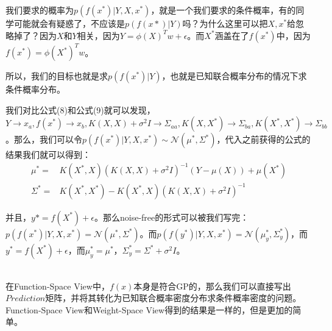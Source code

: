 \documentclass[a4paper]{article}
\begin{document}
我们要求的概率为$p(f(x^\ast)|Y,X,x^\ast)$，就是一个我们要求的条件概率，有的同学可能就会有疑惑了，不应该是$p(f(x\ast)|Y)$吗？为什么这里可以把$X,x^\ast$给忽略掉了？因为$X$和$Y$相关，因为$Y=\phi(X)^Tw+\epsilon$。而$X^\ast$涵盖在了$f(x^\ast)$中，因为$f(x^\ast) = \phi(X^\ast)^Tw$。


所以，我们的目标也就是求$p(f(x^\ast)|Y)$，也就是{\color{red}已知联合概率分布的情况下求条件概率分布。}

我们对比公式(8)和公式(9)就可以发现，$Y\rightarrow x_a,f(x^\ast)\rightarrow x_b,K(X,X)+\sigma^2I \rightarrow \Sigma_{aa},K(X,X^\ast) \rightarrow \Sigma_{ba},K(X^\ast,X^\ast)\rightarrow \Sigma_{bb}$。那么，我们可以令$p(f(x^\ast)|Y,X,x^\ast)\sim\mathcal{N}(\mu^\ast,\Sigma^\ast)$，代入之前获得的公式的结果我们就可以得到：
\begin{equation}
    \begin{split}
        \mu^\ast = & K(X^\ast,X)(K(X,X)+\sigma^2I)^{-1}(Y-\mu(X))+\mu(X^\ast) \\
        \Sigma^\ast = & 
        K(X^\ast,X^\ast)-K(X^\ast,X)(K(X,X)+\sigma^2I)^{-1}
    \end{split}
\end{equation}

并且，$y\ast = f(X^\ast) + \epsilon$。那么noise-free的形式可以被我们写完：$p(f(x^\ast)|Y,X,x^\ast) = \mathcal{N}(\mu^\ast,\Sigma^\ast)$。而$p(f(y^\ast)|Y,X,x^\ast) = \mathcal{N}(\mu^\ast_y,\Sigma^\ast_y)$，而$y^\ast = f(X^\ast) + \epsilon$，而$\mu_{y}^\ast = \mu^{\ast}$，$\Sigma_y^{\ast} = \Sigma^\ast + \sigma^2I$。

~\\

在Function-Space View中，$f(x)$本身是符合GP的，那么我们可以直接写出$Prediction$矩阵，并将其转化为已知联合概率密度分布求条件概率密度的问题。Function-Space View和Weight-Space View得到的结果是一样的，但是更加的简单。
\end{document}

